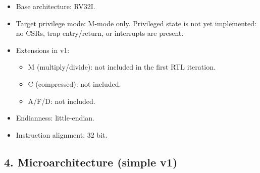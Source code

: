 \documentclass[]{article}
\providecommand{\tightlist}{%
  \setlength{\itemsep}{0pt}\setlength{\parskip}{0pt}}
\begin{document}
\begin{itemize}
\tightlist
\item
  Base architecture: RV32I.
\item
  Target privilege mode: M-mode only. Privileged state is not yet
  implemented: no CSRs, trap entry/return, or interrupts are present.
\item
  Extensions in v1:

  \begin{itemize}
  \tightlist
  \item
    M (multiply/divide): not included in the first RTL iteration.
  \item
    C (compressed): not included.
  \item
    A/F/D: not included.
  \end{itemize}
\item
  Endianness: little-endian.
\item
  Instruction alignment: 32 bit.
\end{itemize}

\hypertarget{4-microarchitecture-simple-v1}{%
\subsection{4. Microarchitecture (simple
v1)}\label{4-microarchitecture-simple-v1}}
\end{document}
